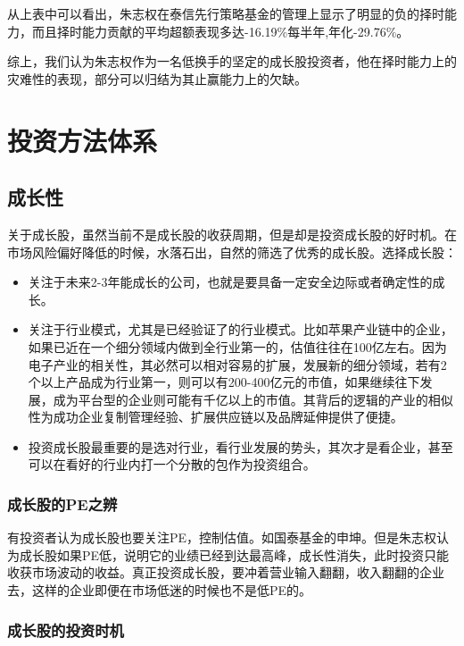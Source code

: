 \documentclass[hyperref,]{ctexart}
\providecommand{\tightlist}{%
  \setlength{\itemsep}{0pt}\setlength{\parskip}{0pt}}
\begin{document}
从上表中可以看出，朱志权在泰信先行策略基金的管理上显示了明显的负的择时能力，而且择时能力贡献的平均超额表现多达-16.19\%每半年,年化-29.76\%。

综上，我们认为朱志权作为一名低换手的坚定的成长股投资者，他在择时能力上的灾难性的表现，部分可以归结为其止赢能力上的欠缺。

\section{投资方法体系}

\subsection{成长性}

关于成长股，虽然当前不是成长股的收获周期，但是却是投资成长股的好时机。在市场风险偏好降低的时候，水落石出，自然的筛选了优秀的成长股。选择成长股：

\begin{itemize}
\tightlist
\item
  关注于未来2-3年能成长的公司，也就是要具备一定安全边际或者确定性的成长。
\item
  关注于行业模式，尤其是已经验证了的行业模式。比如苹果产业链中的企业，如果已近在一个细分领域内做到全行业第一的，估值往往在100亿左右。因为电子产业的相关性，其必然可以相对容易的扩展，发展新的细分领域，若有2个以上产品成为行业第一，则可以有200-400亿元的市值，如果继续往下发展，成为平台型的企业则可能有千亿以上的市值。其背后的逻辑的产业的相似性为成功企业复制管理经验、扩展供应链以及品牌延伸提供了便捷。
\item
  投资成长股最重要的是选对行业，看行业发展的势头，其次才是看企业，甚至可以在看好的行业内打一个分散的包作为投资组合。
\end{itemize}

\subsubsection{成长股的PE之辨}\label{pe}

有投资者认为成长股也要关注PE，控制估值。如国泰基金的申坤。但是朱志权认为成长股如果PE低，说明它的业绩已经到达最高峰，成长性消失，此时投资只能收获市场波动的收益。真正投资成长股，要冲着营业输入翻翻，收入翻翻的企业去，这样的企业即便在市场低迷的时候也不是低PE的。

\subsubsection{成长股的投资时机}
\end{document}
